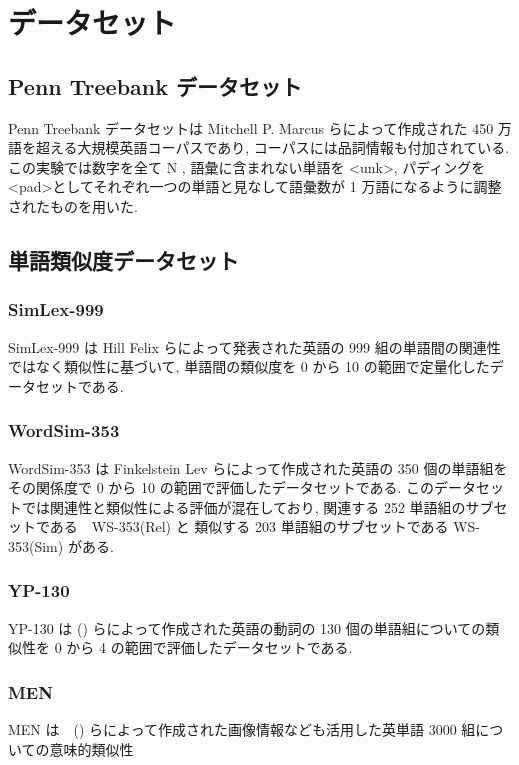 \documentclass[twocolumn]{jarticle}     %
\begin{document}
\section{データセット}
\subsection{Penn Treebank データセット}
Penn Treebank データセット\cite{ptb}は 	Mitchell P. Marcus らによって作成された 450 万語を超える大規模英語コーパスであり, コーパスには品詞情報も付加されている. 
この実験では数字を全て N , 語彙に含まれない単語を \textless unk\textgreater , パディングを \textless pad\textgreater としてそれぞれ一つの単語と見なして語彙数が 1 万語になるように調整されたものを用いた.

\subsection{単語類似度データセット}
\subsubsection{SimLex-999}
SimLex-999 \cite{simlex999} は Hill Felix らによって発表された英語の 999 組の単語間の関連性ではなく類似性に基づいて, 単語間の類似度を 0 から 10 の範囲で定量化したデータセットである. 

\subsubsection{WordSim-353}
WordSim-353 \cite{wordsim353} は Finkelstein Lev らによって作成された英語の 350 個の単語組をその関係度で 0 から 10 の範囲で評価したデータセットである.
このデータセットでは関連性と類似性による評価が混在しており, 関連する 252 単語組のサブセットである　WS-353(Rel) と 類似する 203 単語組のサブセットである WS-353(Sim) がある.

\subsubsection{YP-130}
YP-130 は () らによって作成された英語の動詞の 130 個の単語組についての類似性を 0 から 4 の範囲で評価したデータセットである. 

\subsubsection{MEN}
MEN は　() らによって作成された画像情報なども活用した英単語 3000 組についての意味的類似性
\end{document}
